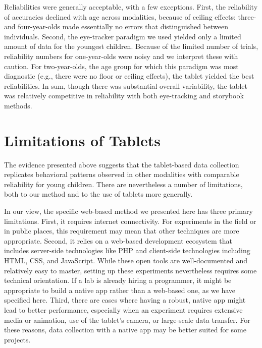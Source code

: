 \documentclass[man,noapacite]{apa2}
\begin{document}
Reliabilities were generally acceptable, with a few exceptions. First, the reliability of accuracies declined with age across modalities, because of ceiling effects: three- and four-year-olds made essentially no errors that distinguished between individuals. Second, the eye-tracker paradigm we used yielded only a limited amount of data for the youngest children. Because of the limited number of trials, reliability numbers for one-year-olds were noisy and we interpret these with caution. For two-year-olds, the age group for which this paradigm was most diagnostic (e.g., there were no floor or ceiling effects), the tablet yielded the best reliabilities. In sum, though there was substantial overall variability, the tablet was relatively competitive in reliability with both eye-tracking and storybook methods. 

\section{Limitations of Tablets}


The evidence presented above suggests that the tablet-based data collection replicates behavioral patterns observed in other modalities with comparable reliability for young children. There are nevertheless a number of limitations, both to our method and to the use of tablets more generally. 


In our view, the specific web-based method we presented here has three primary limitations. First, it requires internet connectivity. For experiments in the field or in public places, this requirement may mean that other techniques are more appropriate. Second, it relies on a web-based development ecosystem that includes server-side technologies like PHP and client-side technologies including HTML, CSS, and JavaScript. While these open tools are well-documented and relatively easy to master, setting up these experiments nevertheless requires some technical orientation. If a lab is already hiring a programmer, it might be appropriate to build a native app rather than a web-based one, as we have specified here. Third, there are cases where having a robust, native app might lead to better performance, especially when an experiment requires extensive media or animation, use of the tablet's camera, or large-scale data transfer.  For these reasons, data collection with a native app may be better suited for some projects.
\end{document}
